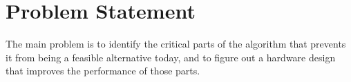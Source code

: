 \chapter{Problem Statement}

	The main problem is to identify the critical parts of the algorithm that
	prevents it from being a feasible alternative today, and to figure out a
	 hardware design that improves the performance of those parts.
